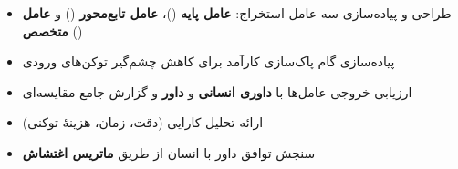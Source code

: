 
\begin{itemize}
\item طراحی و پیاده‌سازی سه عامل استخراج: \textbf{عامل پایه} ()، \textbf{عامل تابع‌محور} () و \textbf{عامل متخصص} ()
\item پیاده‌سازی گام پاک‌سازی کارآمد  برای کاهش چشم‌گیر توکن‌های ورودی
\item ارزیابی خروجی عامل‌ها با \textbf{داوری انسانی} و \textbf{داور } و گزارش جامع مقایسه‌ای
\item ارائه تحلیل کارایی (دقت، زمان، هزینهٔ توکنی)
\item سنجش توافق داور  با انسان از طریق \textbf{ماتریس اغتشاش}
\end{itemize}